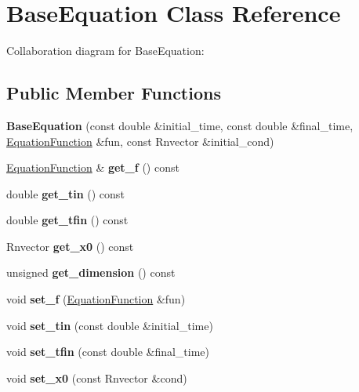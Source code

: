 \hypertarget{classBaseEquation}{}\section{Base\+Equation Class Reference}
\label{classBaseEquation}


Collaboration diagram for Base\+Equation\+:
\subsection*{Public Member Functions}
\begin{DoxyCompactItemize}
\item 
\mbox{\label{classBaseEquation_a649e9bef29ad2885442750f72fde0d69}} 
{\bfseries Base\+Equation} (const double \&initial\+\_\+time, const double \&final\+\_\+time, \hyperlink{structEquationFunction}{Equation\+Function} \&fun, const Rnvector \&initial\+\_\+cond)
\item 
\mbox{\label{classBaseEquation_ad5575137eeccd996ad27ed20ef3d7f69}} 
\hyperlink{structEquationFunction}{Equation\+Function} \& {\bfseries get\+\_\+f} () const
\item 
\mbox{\label{classBaseEquation_ae208cf521727cbdba9f830948a9b434e}} 
double {\bfseries get\+\_\+tin} () const
\item 
\mbox{\label{classBaseEquation_a013b3adfbbc50e6d56f07a1d0831d3fa}} 
double {\bfseries get\+\_\+tfin} () const
\item 
\mbox{\label{classBaseEquation_a7e801dee1909932f54ba022d67cb6ebd}} 
Rnvector {\bfseries get\+\_\+x0} () const
\item 
\mbox{\label{classBaseEquation_a904f532d60a0a3bfab3e317cfc35c171}} 
unsigned {\bfseries get\+\_\+dimension} () const
\item 
\mbox{\label{classBaseEquation_afc56728c1331f42263959a6a6d13b2e1}} 
void {\bfseries set\+\_\+f} (\hyperlink{structEquationFunction}{Equation\+Function} \&fun)
\item 
\mbox{\label{classBaseEquation_a483e1f4df9e791cec7f911b5cff0083a}} 
void {\bfseries set\+\_\+tin} (const double \&initial\+\_\+time)
\item 
\mbox{\label{classBaseEquation_a252acc3f65baabe91d21280bd911c745}} 
void {\bfseries set\+\_\+tfin} (const double \&final\+\_\+time)
\item 
\mbox{\label{classBaseEquation_a07152aa622647f9a2b0e10c5ce330193}} 
void {\bfseries set\+\_\+x0} (const Rnvector \&cond)
\end{DoxyCompactItemize}
